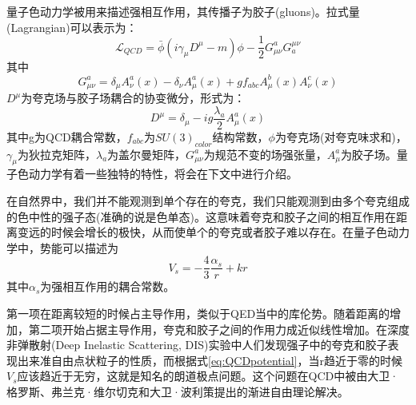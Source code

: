 量子色动力学被用来描述强相互作用，其传播子为胶子(gluons)。拉式量(Lagrangian)可以表示为：
\begin{equation}
    \mathcal{L}_{QCD} = \bar{\phi}(i \gamma_{\mu} D^{\mu}-m)\phi-\frac{1}{2}G^{a}_{\mu\nu}G^{\mu\nu}_{a}
\end{equation}
其中
\begin{equation}
    G^{a}_{\mu\nu} = \delta_{\mu}A_{\nu}^{a}(x) - \delta_{\nu}A_{\mu}^{a}(x) + gf_{abc}A_{\mu}^{b}(x)A_{\nu}^{c}(x)
\end{equation}
$D^{\mu}$为夸克场与胶子场耦合的协变微分，形式为：
\begin{equation}
    D^{\mu} = \delta_{\mu} - ig\frac{\lambda_{a}}{2}A_{\mu}^{a}(x)
\end{equation}
其中g为QCD耦合常数，$f_{abc}$为$SU(3)_{color}$结构常数，$\phi$为夸克场(对夸克味求和)，$\gamma_{\mu}$为狄拉克矩阵，$\lambda_{a}$为盖尔曼矩阵，$G^{a}_{\mu\nu}$为规范不变的场强张量，$A_{\mu}^{a}$为胶子场。量子色动力学有着一些独特的特性，将会在下文中进行介绍。

在自然界中，我们并不能观测到单个存在的夸克，我们只能观测到由多个夸克组成的色中性的强子态(准确的说是色单态)。这意味着夸克和胶子之间的相互作用在距离变远的时候会增长的极快，从而使单个的夸克或者胶子难以存在。在量子色动力学中，势能可以描述为
\begin{equation}
    V_s = -\frac{4}{3}\frac{\alpha_{s}}{r} + kr
    \label{eq:QCDpotential}
\end{equation}
其中$\alpha_{s}$为强相互作用的耦合常数。

第一项在距离较短的时候占主导作用，类似于QED当中的库伦势。随着距离的增加，第二项开始占据主导作用，夸克和胶子之间的作用力成近似线性增加。在深度非弹散射(Deep Inelastic Scattering, DIS)实验中人们发现强子中的夸克和胶子表现出来准自由点状粒子的性质，而根据式\ref{eq:QCDpotential}，当r趋近于零的时候$V_s$应该趋近于无穷，这就是知名的朗道极点问题。这个问题在QCD中被由大卫·格罗斯、弗兰克·维尔切克和大卫·波利策提出的渐进自由理论解决。


